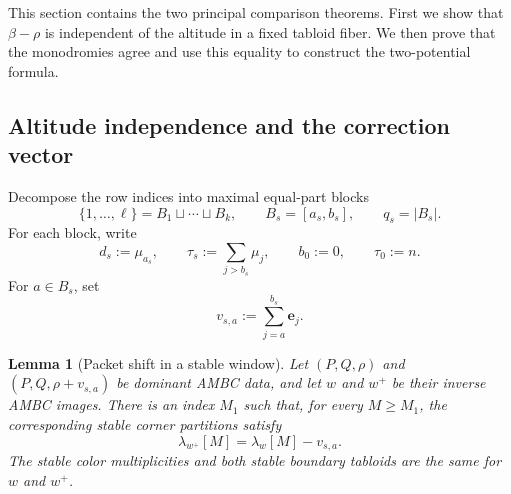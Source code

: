 \documentclass[11pt]{article}
\newtheorem{lemma}[theorem]{Lemma}
\theoremstyle{definition}
\theoremstyle{remark}
\newcommand{\e}{\mathbf e}
\begin{document}
This section contains the two principal comparison theorems.  First we show that
\(\beta-\rho\) is independent of the altitude in a fixed tabloid fiber.  We then prove
that the monodromies agree and use this equality to construct the two-potential formula.

\subsection{Altitude independence and the correction vector}

Decompose the row indices into maximal equal-part blocks
\begin{equation}\label{eq:blocks}
 \{1,\ldots,\ell\}=B_1\sqcup\cdots\sqcup B_k,
 \qquad B_s=[a_s,b_s],
 \qquad q_s=|B_s|.
\end{equation}
For each block, write
\begin{equation}\label{eq:block-data}
 d_s:=\mu_{a_s},\qquad \tau_s:=\sum_{j>b_s}\mu_j,
 \qquad b_0:=0,\qquad \tau_0:=n.
\end{equation}
For \(a\in B_s\), set
\begin{equation}\label{eq:packet-vector}
                         v_{s,a}:=\sum_{j=a}^{b_s}\e_j.
\end{equation}

\begin{lemma}[Packet shift in a stable window]\label{lem:packet-stable-window}
Let \((P,Q,\rho)\) and \((P,Q,\rho+v_{s,a})\) be dominant AMBC data, and let
\(w\) and \(w^+\) be their inverse AMBC images.  There is an index \(M_1\) such that,
for every \(M\ge M_1\), the corresponding stable corner partitions satisfy
\begin{equation}\label{eq:packet-lambda}
             \lambda_{w^+}[M]=\lambda_w[M]-v_{s,a}.
\end{equation}
The stable color multiplicities and both stable boundary tabloids are the same for
\(w\) and \(w^+\).
\end{lemma}
\end{document}
